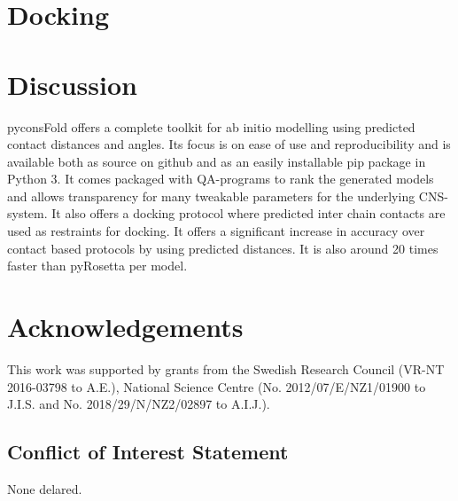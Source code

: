 \documentclass{bioinfo}
\begin{document}
\section{Docking}

\section{Discussion}
pyconsFold offers a complete toolkit for ab initio modelling using predicted contact distances and angles. Its focus is on ease of use and reproducibility and is available both as source on github and as an easily installable pip package in Python 3. It comes packaged with QA-programs to rank the generated models and allows transparency for many tweakable parameters for the underlying CNS-system. It also offers a docking protocol where predicted inter chain contacts are used as restraints for docking. It offers a significant increase in accuracy over contact based protocols by using predicted distances. It is also around 20 times faster than pyRosetta per model.

%
%

\section*{Acknowledgements}
This work was supported by grants from 
the Swedish Research Council (VR-NT 2016-03798 to A.E.),
National Science Centre (No. 2012/07/E/NZ1/01900 to J.I.S. and
No. 2018/29/N/NZ2/02897 to A.I.J.).
\subsection*{Conflict of Interest Statement}
None delared.

% 

%
%
%
%
%
%
%

\end{document}
